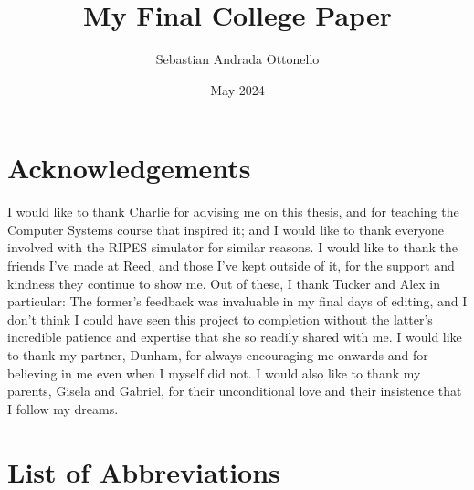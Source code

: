 \documentclass[12pt,twoside]{reedthesis}
\title{My Final College Paper}
\author{Sebastian Andrada Ottonello}
\date{May 2024}
\begin{document}
\maketitle
\frontmatter %
\pagestyle{empty} %

\chapter*{Acknowledgements}
I would like to thank Charlie for advising me on this thesis, and for teaching the Computer Systems course that inspired it; and I would like to thank everyone involved with the RIPES simulator for similar reasons.
I would like to thank the friends I've made at Reed, and those I've kept outside of it, for the support and kindness they continue to show me. Out of these, I thank Tucker and Alex in particular: The former's feedback was invaluable in my final days of editing, and I don't think I could have seen this project to completion without the latter's incredible patience and expertise that she so readily shared with me.
I would like to thank my partner, Dunham, for always encouraging me onwards and for believing in me even when I myself did not.
I would also like to thank my parents, Gisela and Gabriel, for their unconditional love and their insistence that I follow my dreams.




\chapter*{List of Abbreviations}
\end{document}
